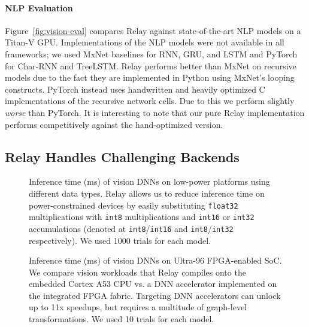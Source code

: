   \paragraph{NLP Evaluation}
  Figure~\ref{fig:vision-eval} compares Relay against state-of-the-art NLP models on a Titan-V GPU.
  Implementations of the NLP models were not available in all frameworks;
    we used MxNet baselines for RNN, GRU, and LSTM and PyTorch for Char-RNN and TreeLSTM.
  Relay performs better than MxNet on recursive models
    due to the fact they are implemented in Python using
    MxNet's looping constructs.
  PyTorch instead uses handwritten and heavily optimized
    C implementations of the recursive network cells.
  Due to this we perform slightly \emph{worse} than PyTorch.
  It is interesting to note that our pure Relay
    implementation performs competitively against
    the hand-optimized version.

  \subsection{Relay Handles Challenging Backends}
  \label{sec:low-power}

  \begin{figure}[h]
    \caption{
      Inference time (ms) of vision DNNs on low-power platforms using
        different data types.
      Relay allows us to reduce inference time on power-constrained devices by
        easily substituting \texttt{float32} multiplications with \texttt{int8}
        multiplications and \texttt{int16} or \texttt{int32} accumulations (denoted
        at \texttt{int8}/\texttt{int16} and \texttt{int8}/\texttt{int32} respectively).
      We used 1000 trials for each model.
    }
  \end{figure}

  \begin{figure}[h]
    \caption{
      Inference time (ms) of vision DNNs on Ultra-96 FPGA-enabled SoC.
      We compare vision workloads that Relay compiles onto the embedded Cortex
        A53 CPU vs. a DNN accelerator implemented on the integrated FPGA fabric.
      Targeting DNN accelerators can unlock up to 11x speedups, but requires a
        multitude of graph-level transformations.
      We used 10 trials for each model.
    }
  \end{figure}

